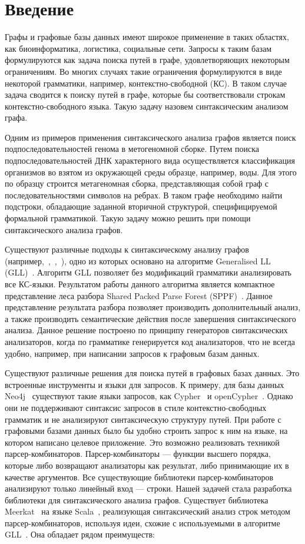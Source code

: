 \section*{Введение}
Графы и графовые базы данных имеют широкое применение в таких областях, как биоинформатика, логистика, социальные сети. Запросы к таким базам формулируются как задача поиска путей в графе, удовлетворяющих некоторым ограничениям. Во многих случаях такие ограничения формулируются в виде некоторой грамматики, например, контекстно-свободной (КС). В таком случае задача сводится к поиску путей в графе, которые бы соответствовали строкам контекстно-свободного языка. Такую задачу назовем синтаксическим анализом графа. 

Одним из примеров применения синтаксического анализа графов является поиск подпоследовательностей генома в метогеномной сборке. Путем поиска подпоследовательностей ДНК характерного вида осуществляется классификация организмов во взятом из окружающей среды образце, например, воды. Для этого по образцу строится метагеномная сборка, представляющая собой граф с последовательностями символов на ребрах. В таком графе необходимо найти подстроки, обладающие заданной вторичной структурой, специфицируемой формальной грамматикой. Такую задачу можно решить при помощи синтаксического анализа графов.

Существуют различные подходы к синтаксическому анализу графов (например,~\cite{GrigRagCFPQuerying},~\cite{Hellings120},~\cite{Sevon}), одно из которых основано на алгоритме Generalised LL (GLL)~\cite{GrigRagCFPQuerying}. Алгоритм GLL позволяет без модификаций грамматики анализировать все КС-языки. Результатом работы данного алгоритма является компактное представление леса разбора Shared Packed Parse Forest (SPPF)~\cite{SPPF}. Данное представление результата разбора позволяет производить дополнительный анализ, а также производить семантические действия после завершения синтаксического анализа. Данное решение построено по принципу генераторов синтаксических анализаторов, когда по грамматике генерируется код анализаторов, что не всегда удобно, например, при написании запросов к графовым базам данных.

Существуют различные решения для поиска путей в графовых базах данных. Это встроенные инструменты и языки для запросов. К примеру, для базы данных Neo4j~\cite{Neo4j} существуют такие языки запросов, как Cypher~\cite{Cypher} и openCypher~\cite{openCypher}. Однако они не поддерживают синтаксис запросов в стиле контекстно-свободных грамматик и не анализируют синтаксическую структуру путей. При работе с графовыми базами данных было бы удобно строить запрос к ним на языке, на котором написано целевое приложение. Это возможно реализовать техникой парсер-комбинаторов. Парсер-комбинаторы --- функции высшего порядка, которые либо возвращают анализаторы как результат, либо принимающие их в качестве аргументов. Все существующие библиотеки парсер-комбинаторов анализируют только линейный вход --- строки. Нашей задачей стала разработка библиотеки для синтаксического анализа графов. Существует библиотека Meerkat~\cite{Meerkat} на языке Scala~\cite{Scala}, реализующая синтаксический анализ строк методом парсер-комбинаторов, используя идеи, схожие с используемыми в алгоритме GLL~\cite{GLL}. Она обладает рядом преимуществ:

